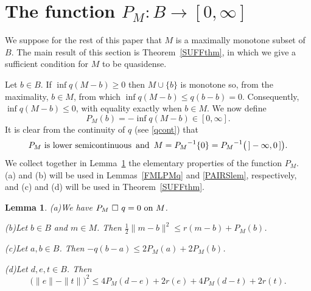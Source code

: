 \documentclass[letterpaper]{article}
\theoremstyle{plain}
\newtheorem{lemma}[theorem]{Lemma}
\theoremstyle{definition}
\numberwithin{equation}{section}
\newcommand{\half}{{\textstyle\frac{1}{2}}}
\newcommand{\on}{\hbox{on}}
\newcommand{\ssquare}{\ \square\ }
\newcommand{\Lem}{Lemma~\ref}
\newcommand{\Lems}{Lemmas~\ref}
\newcommand{\Thm}{Theorem~\ref}
\begin{document}
\section{The function $P_M\colon B \to [0,\infty]$}\label{Psec}
We suppose for the rest of  this paper that $M$ is a maximally monotone subset of $B$.   The main result of this section is \Thm{SUFFthm}, in which we give a sufficient condition for $M$ to be quasidense. 
\par
Let $b \in B$.   If $\inf q(M - b) \ge 0$ then $M\cup\{b\}$ is monotone so, from the maximality, $b \in M$, from which $\inf q(M - b) \le q(b - b) = 0$.   Consequently, $\inf q(M - b) \le 0$, with equality exactly when $b \in M$.  We now define
\begin{equation}\label{P}
P_M(b) = -\inf q(M - b) \in [0,\infty].
\end{equation}
%
It is clear from the continuity of $q$ \big(see \eqref{qcont}\big) that
\begin{equation}\label{P2}
P_M\hbox{ is lower semicontinuous\enspace and\enspace}M = {P_M}^{-1}\{0\} = {P_M}^{-1}\big(\,]-\infty,0\,]\big).
\end{equation}
%
We collect together in \Lem{Plem} the elementary properties of the function $P_M$.   (a) and (b)  will be used in \Lems{FMLPMq} and \ref{PAIRSlem}, respectively, and (c) and (d) will be used in \Thm{SUFFthm}. 
\begin{lemma}\label{Plem}
{\rm(a)}\enspace We have $P_M \ssquare q = 0\ \on\ M$.\par
{\rm(b)}\enspace Let $b \in B$ and $m \in M$.   Then $\half\|m - b\|^2 \le r(m - b) + P_M(b)$.\par
{\rm(c)}\enspace Let $a,b \in B$.  Then $-q(b - a) \le 2P_M(a) + 2P_M(b)$.
\par
{\rm(d)}\enspace Let $d,e,t \in B$.   Then    
$$\big(\|e\| - \|t\|\big)^2 \le 4P_M(d -e) + 2r(e) + 4P_M(d -t) + 2r(t).$$   
\end{lemma} 
%
\end{document}
